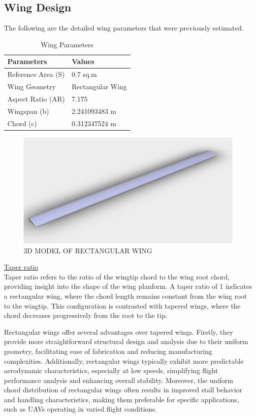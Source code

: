 \documentclass[12 pt]{article}
\begin{document}
{\subsection{Wing Design}
\color{black}
The following are the detailed wing parameters that were previously estimated.
\begin{table}[H]
\centering
\begin{tabular}{|l|l|}
\hline
\textbf{Parameters} & \textbf{Values} \\
\hline
Reference Area (S) & 0.7 sq.m \\
Wing Geometry & Rectangular Wing \\
Aspect Ratio (AR) & 7.175 \\
Wingspan (b) & 2.241093483 m \\
Chord (c) & 0.312347524 m \\
\hline
\end{tabular}
\caption{Wing Parameters}
\label{tab:wing_parameters}
\end{table}
\begin{figure}[H]
    \centering
    \includegraphics[width=1.0\linewidth]{3d_wing.png}
    \caption{3D MODEL OF RECTANGULAR WING}
    \label{3D MODEL OF RECTANGULAR WING}
    \end{figure}
\color{red}
 \large{\underline{Taper ratio}}
\color{black}
\vspace{5mm}
\\Taper ratio refers to the ratio of the wingtip chord to the wing root chord, providing insight into the shape of the wing planform. A taper ratio of 1 indicates a rectangular wing, where the chord length remains constant from the wing root to the wingtip. This configuration is contrasted with tapered wings, where the chord decreases progressively from the root to the tip.

Rectangular wings offer several advantages over tapered wings. Firstly, they provide more straightforward structural design and analysis due to their uniform geometry, facilitating ease of fabrication and reducing manufacturing complexities. Additionally, rectangular wings typically exhibit more predictable aerodynamic characteristics, especially at low speeds, simplifying flight performance analysis and enhancing overall stability. Moreover, the uniform chord distribution of rectangular wings often results in improved stall behavior and handling characteristics, making them preferable for specific applications, such as UAVs operating in varied flight conditions.

}
\end{document}
